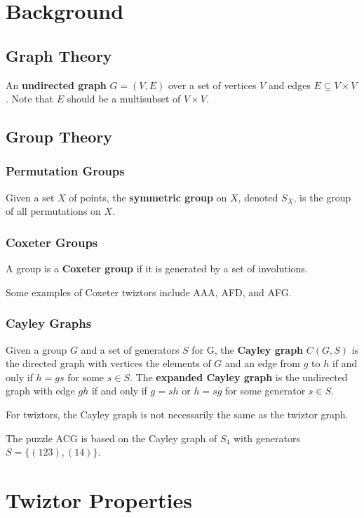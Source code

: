 \documentclass{report}
\begin{document}
\chapter{Background}

\section{Graph Theory}

An {\bf undirected graph} $G = (V, E)$ over a set of vertices $V$ and edges $E\subseteq V\times V$.
Note that $E$ should be a multisubset of $V\times V$.

\section{Group Theory}

\subsection{Permutation Groups}

Given a set $X$ of points, the {\bf symmetric group} on $X$, denoted $S_X$, is the group of all permutations on $X$.

\subsection{Coxeter Groups}

A group is a {\bf Coxeter group} if it is generated by a set of involutions.

Some examples of Coxeter twiztors include AAA, AFD, and AFG.

\subsection{Cayley Graphs}

Given a group $G$ and a set of generators $S$ for G, the {\bf Cayley graph} $C(G, S)$ is the directed graph with vertices the elements of $G$ and an edge from $g$ to $h$ if and only if $h = gs$ for some $s\in S$.
The {\bf expanded Cayley graph} is the undirected graph with edge $gh$ if and only if $g = sh$ or $h = sg$ for some generator $s\in S$.

For twiztors, the Cayley graph is not necessarily the same as the twiztor graph.

The puzzle ACG is based on the Cayley graph of $S_4$ with generators $S = \{(1 2 3), (1 4)\}$.

\chapter{Twiztor Properties}
\end{document}
